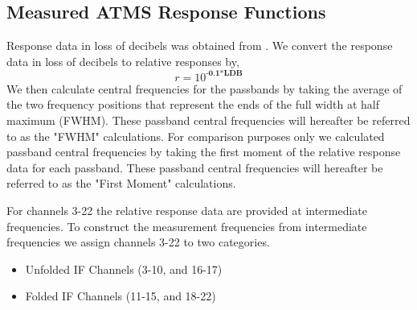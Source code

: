 \subsection{Measured ATMS Response Functions}
Response data in loss of decibels was obtained from \cite{ATMS_PFM_CalLog}. We convert the response data in loss of decibels to relative responses by, 
\begin{equation}
  r=10^{\textbf{-0.1*LDB}}    
\end{equation}
We then calculate central frequencies for the passbands by taking the average of the two frequency positions that represent the ends of the full width
at half maximum (FWHM). These passband central frequencies will hereafter be referred to as the "FWHM" calculations. For comparison purposes only we 
calculated passband central frequencies by taking the first moment of the relative response data for each passband. These passband central frequencies
will hereafter be referred to as the "First Moment" calculations.


 
For channels 3-22 the relative response data are provided at intermediate frequencies. 
To construct the measurement frequencies from intermediate frequencies we assign channels 3-22 to two categories. 

\begin{itemize}
  \item{Unfolded IF Channels (3-10, and 16-17)}
  \item{Folded IF Channels (11-15, and 18-22)}  
\end{itemize}

